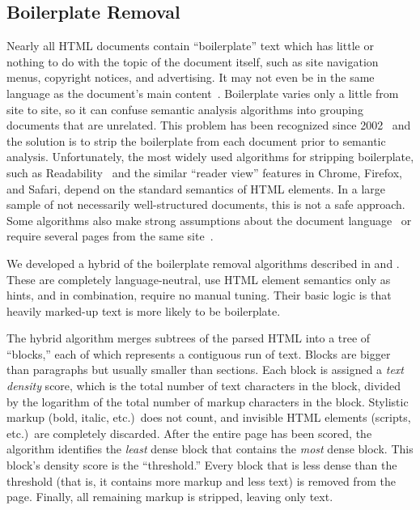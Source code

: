 \subsection{Boilerplate Removal}\label{s:boilerplate}

Nearly all HTML documents contain “boilerplate” text which has
little or nothing to do with the topic of the document itself, such as
site navigation menus, copyright notices, and advertising.  It may not
even be in the same language as the document's main
content~\cite{SC:USENIXSec14}.  Boilerplate varies only a little from
site to site, so it can confuse semantic analysis algorithms into
grouping documents that are unrelated.  This problem has been
recognized since 2002~\cite{baryossef.2002.template} and the solution
is to strip the boilerplate from each document prior to semantic
analysis.  Unfortunately, the most widely used algorithms for
stripping boilerplate, such as Readability~\cite{readability.nd} and
the similar “reader view” features in Chrome, Firefox, and Safari,
depend on the standard semantics of HTML elements.  In a large sample
of not necessarily well-structured documents, this is not a safe
approach.  Some algorithms also make strong assumptions about the
document language~\cite{evert.2008.ncleaner} or require several pages
from the same site~\cite{SC:USENIXSec14}.

We developed a hybrid of the boilerplate removal algorithms described
in \textcite{lin2012combining} and \textcite{sun.2011.dombased}.
These are completely language-neutral, use HTML element semantics only
as hints, and in combination, require no manual tuning.  Their basic
logic is that heavily marked-up text is more likely to be boilerplate.

The hybrid algorithm merges subtrees of the parsed HTML into a tree of
“blocks,” each of which represents a contiguous run of text.  Blocks
are bigger than paragraphs but usually smaller than sections.  Each
block is assigned a \emph{text density} score, which is the total
number of text characters in the block, divided by the logarithm of
the total number of markup characters in the block.  Stylistic markup
(bold, italic, etc.)\ does not count, and invisible HTML elements
(scripts, etc.)\ are completely discarded.  After the entire page has
been scored, the algorithm identifies the \emph{least} dense block
that contains the \emph{most} dense block.  This block's density score
is the “threshold.” Every block that is less dense than the threshold
(that is, it contains more markup and less text) is removed from the
page.  Finally, all remaining markup is stripped, leaving only text.

